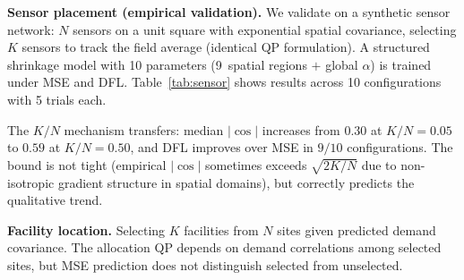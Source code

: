 \documentclass[letterpaper]{article}
\begin{document}
\textbf{Sensor placement (empirical validation).} We validate on a synthetic sensor network: $N$ sensors on a unit square with exponential spatial covariance, selecting $K$ sensors to track the field average (identical QP formulation). A structured shrinkage model with 10 parameters (9~spatial regions $+$ global $\alpha$) is trained under MSE and DFL. Table~\ref{tab:sensor} shows results across 10 configurations with 5 trials each.

\begin{table}[h]
\centering
\caption{Sensor placement: gradient alignment and DFL gain across $K/N$. The bound $\sqrt{2K/N}$ correctly predicts the qualitative trend: $|\cos|$ increases with $K/N$.}
\label{tab:sensor}
\footnotesize
{}
\end{table}

The $K/N$ mechanism transfers: median $|\cos|$ increases from $0.30$ at $K/N{=}0.05$ to $0.59$ at $K/N{=}0.50$, and DFL improves over MSE in $9/10$ configurations. The bound is not tight (empirical $|\cos|$ sometimes exceeds $\sqrt{2K/N}$ due to non-isotropic gradient structure in spatial domains), but correctly predicts the qualitative trend.

\textbf{Facility location.} Selecting $K$ facilities from $N$ sites given predicted demand covariance. The allocation QP depends on demand correlations among selected sites, but MSE prediction does not distinguish selected from unselected.
\end{document}
